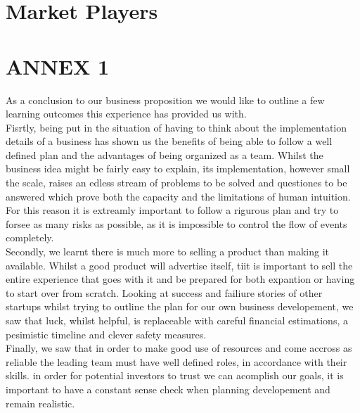 \documentclass[11pt]{article}
\begin{document}
\section{Market Players}


\section{ANNEX 1}

As a conclusion to our business proposition we would like to outline a few learning outcomes this experience has provided us with.\\

\noindent Fisrtly, being put in the situation of having to think about the implementation details of a business has shown us the benefits of being able to follow a well defined plan and the advantages of being organized as a team. Whilst the business idea might be fairly easy to explain, its implementation, however small the scale, raises an edless stream of problems to be solved and questiones to be answered which prove both the capacity and the limitations of human intuition. For this reason it is extreamly important to follow a rigurous plan and try to forsee as many risks as possible, as it is impossible to control the flow of events completely. \\

\noindent Secondly, we learnt there is much more to selling a product than making it available. Whilst a good product will advertise itself, tiit is important to sell the entire experience that goes with it and be prepared for both expantion or having to start over from scratch. Looking at success and failiure stories of other startups whilst trying to outline the plan for our own business developement, we saw that luck, whilst helpful, is replaceable with careful financial estimations, a pesimistic timeline and clever safety measures. \\

\noindent Finally, we saw that in order to make good use of resources and come accross as reliable the leading team must have well defined roles, in accordance with their skills. in order for potential investors to trust we can acomplish our goals, it is important to have a constant sense check when planning developement and remain realistic.\\
\end{document}
